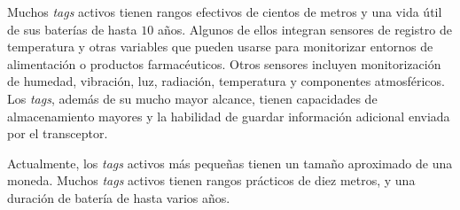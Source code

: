 Muchos \emph{tags} activos tienen rangos efectivos de cientos de metros y una vida útil de sus baterías de hasta $10$ años. Algunos de ellos integran sensores de registro de temperatura y otras variables que pueden usarse para monitorizar entornos de alimentación o productos farmacéuticos. Otros sensores incluyen monitorización de humedad, vibración, luz, radiación, temperatura y componentes atmosféricos. Los \emph{tags}, además de su mucho mayor alcance, tienen capacidades de almacenamiento mayores y la habilidad de guardar información adicional enviada por el transceptor.

Actualmente, los \emph{tags} activos más pequeñas tienen un tamaño aproximado de una moneda. Muchos \emph{tags} activos tienen rangos prácticos de diez metros, y una duración de batería de hasta varios años.

